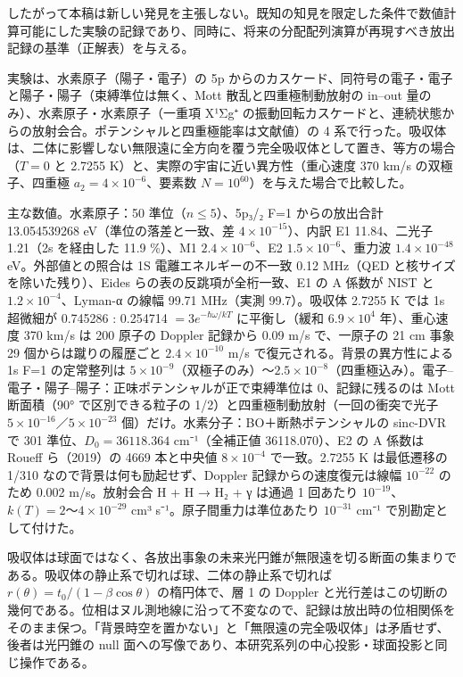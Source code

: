 \documentclass[
  a4paper,
]{ltjsarticle}
\begin{document}
したがって本稿は新しい発見を主張しない。既知の知見を限定した条件で数値計算可能にした実験の記録であり、同時に、将来の分配配列演算が再現すべき放出記録の基準（正解表）を与える。

実験は、水素原子（陽子・電子）の 5p
からのカスケード、同符号の電子・電子と陽子・陽子（束縛準位は無く、Mott
散乱と四重極制動放射の in--out 量のみ）、水素原子・水素原子（一重項
X¹Σg⁺
の振動回転カスケードと、連続状態からの放射会合。ポテンシャルと四重極能率は文献値）の
4
系で行った。吸収体は、二体に影響しない無限遠に全方向を覆う完全吸収体として置き、等方の場合（\(T=0\)
と 2.7255 K）と、実際の宇宙に近い異方性（重心速度 370 km/s
の双極子、四重極 \(a_2=4\times10^{-6}\)、要素数
\(N=10^{60}\)）を与えた場合で比較した。

主な数値。水素原子：50 準位（\(n\le5\)）、5p₃/₂ F=1 からの放出合計
13.054539268 eV（準位の落差と一致、差 \(4\times10^{-15}\)）、内訳 E1
11.84、二光子 1.21（2s を経由した 11.9 \%）、M1 \(2.4\times10^{-6}\)、E2
\(1.5\times10^{-6}\)、重力波 \(1.4\times10^{-48}\) eV。外部値との照合は
1S 電離エネルギーの不一致 0.12 MHz（QED と核サイズを除いた残り）、Eides
らの表の反跳項が全桁一致、E1 の A 係数が NIST と
\(1.2\times10^{-4}\)、Lyman-α の線幅 99.71 MHz（実測 99.7）。吸収体
2.7255 K では 1s 超微細が 0.745286 : 0.254714 \(=3e^{-\hbar\omega/kT}\)
に平衡し（緩和 \(6.9\times10^4\) 年）、重心速度 370 km/s は 200 原子の
Doppler 記録から 0.09 m/s で、一原子の 21 cm 事象 29
個からは蹴りの履歴ごと \(2.4\times10^{-10}\) m/s
で復元される。背景の異方性による 1s F=1 の定常整列は
\(5\times10^{-9}\)（双極子のみ）〜\(2.5\times10^{-8}\)（四重極込み）。電子--電子・陽子--陽子：正味ポテンシャルが正で束縛準位は
0、記録に残るのは Mott 断面積（90° で区別できる粒子の
1/2）と四重極制動放射（一回の衝突で光子
\(5\times10^{-16}\)／\(5\times10^{-23}\)
個）だけ。水素分子：BO＋断熱ポテンシャルの sinc-DVR で 301
準位、\(D_0=36118.364\) cm⁻¹（全補正値 36118.070）、E2 の A 係数は
Roueff ら（2019）の 4669 本と中央値 \(8\times10^{-4}\) で一致。2.7255 K
は最低遷移の 1/310 なので背景は何も励起せず、Doppler
記録からの速度復元は線幅 \(10^{-22}\) のため 0.002 m/s。放射会合 H + H →
H₂ + γ は通過 1 回あたり \(10^{-19}\)、\(k(T)=2\)〜\(4\times10^{-29}\)
cm³ s⁻¹。原子間重力は準位あたり \(10^{-31}\) cm⁻¹ で別勘定として付けた。

吸収体は球面ではなく、各放出事象の未来光円錐が無限遠を切る断面の集まりである。吸収体の静止系で切れば球、二体の静止系で切れば
\(r(\theta)=t_0/(1-\beta\cos\theta)\) の楕円体で、層 1 の Doppler
と光行差はこの切断の幾何である。位相はヌル測地線に沿って不変なので、記録は放出時の位相関係をそのまま保つ。「背景時空を置かない」と「無限遠の完全吸収体」は矛盾せず、後者は光円錐の
null 面への写像であり、本研究系列の中心投影・球面投影と同じ操作である。
\end{document}
